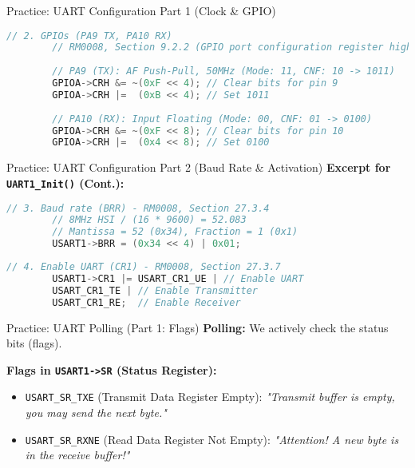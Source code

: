 \documentclass{beamer}
\begin{document}
\begin{frame}[fragile]{Practice: UART Configuration Part 1 (Clock \& GPIO)}
	\begin{lstlisting}[language=C, style=mystyle]
		// 2. GPIOs (PA9 TX, PA10 RX)
		// RM0008, Section 9.2.2 (GPIO port configuration register high)
		
		// PA9 (TX): AF Push-Pull, 50MHz (Mode: 11, CNF: 10 -> 1011)
		GPIOA->CRH &= ~(0xF << 4); // Clear bits for pin 9
		GPIOA->CRH |=  (0xB << 4); // Set 1011
		
		// PA10 (RX): Input Floating (Mode: 00, CNF: 01 -> 0100)
		GPIOA->CRH &= ~(0xF << 8); // Clear bits for pin 10
		GPIOA->CRH |=  (0x4 << 8); // Set 0100
	\end{lstlisting}
\end{frame}

\begin{frame}[fragile]{Practice: UART Configuration Part 2 (Baud Rate \& Activation)}
	\textbf{Excerpt for \texttt{UART1\_Init()} (Cont.):}
	
	\begin{lstlisting}[language=C, style=mystyle]
		// 3. Baud rate (BRR) - RM0008, Section 27.3.4
		// 8MHz HSI / (16 * 9600) = 52.083
		// Mantissa = 52 (0x34), Fraction = 1 (0x1)
		USART1->BRR = (0x34 << 4) | 0x01;
	\end{lstlisting}
	
	\begin{lstlisting}[language=C, style=mystyle]
		// 4. Enable UART (CR1) - RM0008, Section 27.3.7
		USART1->CR1 |= USART_CR1_UE | // Enable UART
		USART_CR1_TE | // Enable Transmitter
		USART_CR1_RE;  // Enable Receiver
	\end{lstlisting}
\end{frame}

\begin{frame}[fragile]{Practice: UART Polling (Part 1: Flags)}
	\textbf{Polling:} We actively check the status bits (flags).
	
	\medskip
	\textbf{Flags in \texttt{USART1->SR} (Status Register):}
	\begin{itemize}
		\item \texttt{USART\_SR\_TXE} (Transmit Data Register Empty):
		\textit{"Transmit buffer is empty, you may send the next byte."}
		
		\medskip
		\item \texttt{USART\_SR\_RXNE} (Read Data Register Not Empty):
		\textit{"Attention! A new byte is in the receive buffer!"}
	\end{itemize}
\end{frame}
\end{document}
